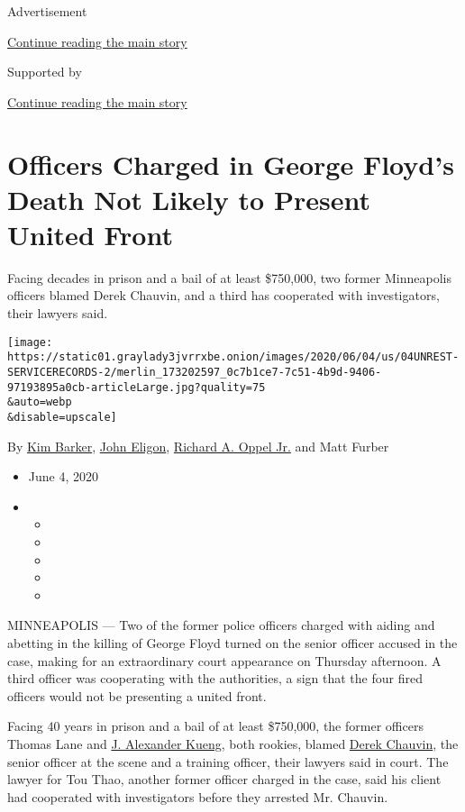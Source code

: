 Advertisement

\protect\hyperlink{after-top}{Continue reading the main story}

Supported by

\protect\hyperlink{after-sponsor}{Continue reading the main story}

\hypertarget{officers-charged-in-george-floyds-death-not-likely-to-present-united-front}{%
\section{Officers Charged in George Floyd's Death Not Likely to Present
United
Front}\label{officers-charged-in-george-floyds-death-not-likely-to-present-united-front}}

Facing decades in prison and a bail of at least \$750,000, two former
Minneapolis officers blamed Derek Chauvin, and a third has cooperated
with investigators, their lawyers said.

\texttt{[image: https://static01.graylady3jvrrxbe.onion/images/2020/06/04/us/04UNREST-SERVICERECORDS-2/merlin\_173202597\_0c7b1ce7-7c51-4b9d-9406-97193895a0cb-articleLarge.jpg?quality=75\\\&auto=webp\\\&disable=upscale]}

By \href{https://www.nytimes3xbfgragh.onion/by/kim-barker}{Kim Barker},
\href{https://www.nytimes3xbfgragh.onion/by/john-eligon}{John Eligon},
\href{https://www.nytimes3xbfgragh.onion/by/richard-a-oppel-jr}{Richard
A. Oppel Jr.} and Matt Furber

\begin{itemize}
\item
  June 4, 2020
\item
  \begin{itemize}
  \item
  \item
  \item
  \item
  \item
  \end{itemize}
\end{itemize}

MINNEAPOLIS --- Two of the former police officers charged with aiding
and abetting in the killing of George Floyd turned on the senior officer
accused in the case, making for an extraordinary court appearance on
Thursday afternoon. A third officer was cooperating with the
authorities, a sign that the four fired officers would not be presenting
a united front.

Facing 40 years in prison and a bail of at least \$750,000, the former
officers Thomas Lane and
\href{https://www.nytimes3xbfgragh.onion/2020/06/27/us/minneapolis-police-officer-kueng.html}{J.
Alexander Kueng}, both rookies, blamed
\href{https://www.nytimes3xbfgragh.onion/2020/07/18/us/derek-chauvin-george-floyd.html}{Derek
Chauvin}, the senior officer at the scene and a training officer, their
lawyers said in court. The lawyer for Tou Thao, another former officer
charged in the case, said his client had cooperated with investigators
before they arrested Mr. Chauvin.


